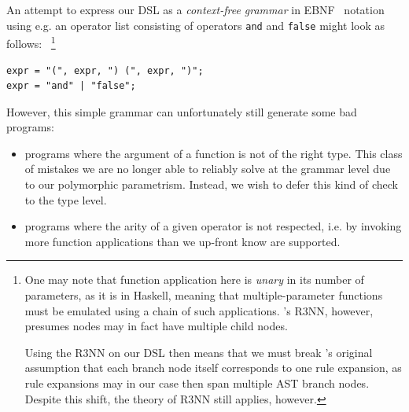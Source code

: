 \documentclass{article} %
\begin{document}
%
An attempt to express our DSL
as a \emph{context-free grammar} in EBNF~\citep{standard1996ebnf} notation
using e.g. an operator list consisting of operators \verb|and| and \verb|false|
might look as follows:
~\footnote{
    One may note that function application here is \emph{unary} in its number of parameters, as it is in Haskell,
    meaning that multiple-parameter functions must be emulated using a chain of such applications.
    \citet{nsps}'s R3NN, however, presumes nodes may in fact have multiple child nodes.

    Using the R3NN on our DSL then means that we must break \citet{nsps}'s original
    assumption that each branch node itself corresponds to one rule expansion,
    as rule expansions may in our case then span multiple AST branch nodes.
    Despite this shift, the theory of R3NN still applies, however.
}

\begin{verbatim}
expr = "(", expr, ") (", expr, ")";
expr = "and" | "false";
\end{verbatim}



However, this simple grammar can unfortunately still generate some bad programs:
\begin{itemize}
    \item programs where the argument of a function is not of the right type.
        This class of mistakes we are no longer able to reliably solve
        at the grammar level due to our polymorphic parametrism.
        Instead, we wish to defer this kind of check to the type level.
    \item programs where the arity of a given operator is not respected, i.e.
        by invoking more function applications than we up-front know are supported.
\end{itemize}
\end{document}
